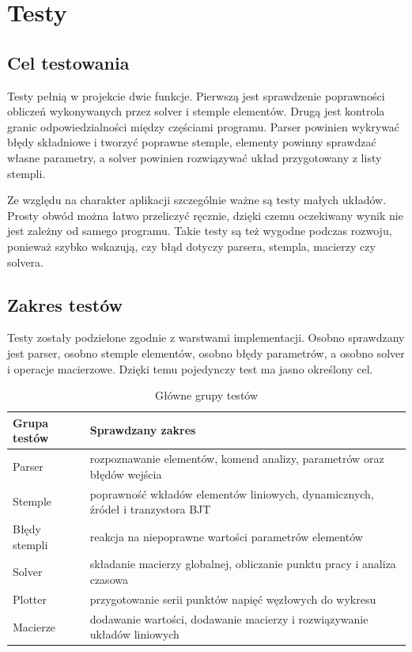 \chapter{Testy}
\label{chap:testy}

\section{Cel testowania}
\label{sec:cel-testowania}

Testy pełnią w projekcie dwie funkcje. Pierwszą jest sprawdzenie poprawności obliczeń wykonywanych przez solver i stemple elementów. Drugą jest kontrola granic odpowiedzialności między częściami programu. Parser powinien wykrywać błędy składniowe i tworzyć poprawne stemple, elementy powinny sprawdzać własne parametry, a solver powinien rozwiązywać układ przygotowany z listy stempli.

Ze względu na charakter aplikacji szczególnie ważne są testy małych układów. Prosty obwód można łatwo przeliczyć ręcznie, dzięki czemu oczekiwany wynik nie jest zależny od samego programu. Takie testy są też wygodne podczas rozwoju, ponieważ szybko wskazują, czy błąd dotyczy parsera, stempla, macierzy czy solvera.

\section{Zakres testów}
\label{sec:zakres-testow}

Testy zostały podzielone zgodnie z warstwami implementacji. Osobno sprawdzany jest parser, osobno stemple elementów, osobno błędy parametrów, a osobno solver i operacje macierzowe. Dzięki temu pojedynczy test ma jasno określony cel.

\begin{table}[H]
\centering
\caption{Główne grupy testów}
\label{tab:grupy-testow}
\begin{tabularx}{\textwidth}{@{}lX@{}}
\toprule
Grupa testów & Sprawdzany zakres \\
\midrule
Parser & rozpoznawanie elementów, komend analizy, parametrów oraz błędów wejścia \\
Stemple & poprawność wkładów elementów liniowych, dynamicznych, źródeł i tranzystora BJT \\
Błędy stempli & reakcja na niepoprawne wartości parametrów elementów \\
Solver & składanie macierzy globalnej, obliczanie punktu pracy i analiza czasowa \\
Plotter & przygotowanie serii punktów napięć węzłowych do wykresu \\
Macierze & dodawanie wartości, dodawanie macierzy i rozwiązywanie układów liniowych \\
\bottomrule
\end{tabularx}
\end{table}

